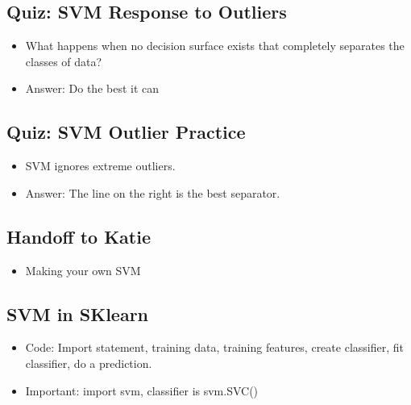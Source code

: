 \documentclass[12pt]{report}
\begin{document}
\subsection{Quiz: SVM Response to Outliers}

\begin{itemize} 

\item What happens when no decision surface exists that completely separates the classes of data?

\item Answer: Do the best it can

\end{itemize}

\subsection{Quiz: SVM Outlier Practice}

\begin{itemize} 

\item SVM ignores extreme outliers. 

\item Answer: The line on the right is the best separator. 

\end{itemize}

\subsection{Handoff to Katie}

\begin{itemize} 

\item Making your own SVM

\end{itemize}

\subsection{SVM in SKlearn}

\begin{itemize}

\item Code: Import statement, training data, training features, create classifier, fit classifier, do a prediction.

\item Important: import svm, classifier is svm.SVC()

\end{itemize}
\end{document}
